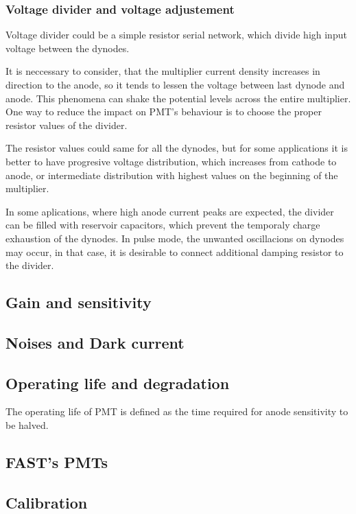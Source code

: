 \subsubsection{Voltage divider and voltage adjustement}
Voltage divider could be a simple resistor serial network, which divide high input voltage between the dynodes. 
\par
It is neccessary to consider, that the multiplier current density increases in direction to the anode, so it tends to lessen the voltage between last dynode and anode. This phenomena can shake the potential levels across the entire multiplier. One way to reduce the impact on PMT's behaviour is to choose the proper resistor values of the divider. 
\par
The resistor values could same for all the dynodes, but for some applications it is better to have progresive voltage distribution, which increases from cathode to anode, or intermediate distribution with highest values on the beginning of the multiplier.

\par
In some aplications, where high anode current peaks are expected, the divider can be filled with reservoir capacitors, which prevent the temporaly charge exhaustion of the dynodes. In pulse mode, the unwanted oscillacions on dynodes may occur, in that case, it is desirable to connect additional damping resistor to the divider.


\subsection{Gain and sensitivity}

\subsection{Noises and Dark current}

\subsection{Operating life and degradation}
The operating life of PMT is defined as the time required for anode sensitivity to be halved.


\subsection{FAST's PMTs}

\subsection{Calibration}

